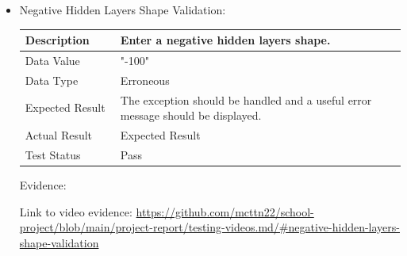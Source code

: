 \documentclass[./project-report/src/latex/project-report.tex]{subfiles}
\begin{document}
\begin{itemize}
	\item Negative Hidden Layers Shape Validation: \newline\newline
		\begin{tabular}{|p{0.25\linewidth}|p{0.75\linewidth}|}
			\hline
			Description & Enter a negative hidden layers shape. \\
			\hline
			Data Value & "-100" \\
			\hline
			Data Type & Erroneous \\
			\hline
			Expected Result & The exception should be handled and a useful error message should be displayed. \\
			\hline
			Actual Result & Expected Result \\
			\hline
			Test Status & Pass \\
			\hline
		\end{tabular}

		\vspace{5mm}

		Evidence:
		\begin{figure}[h!]
		\centering
		\end{figure}

		\begin{sloppypar}
		Link to video evidence: \url{https://github.com/mcttn22/school-project/blob/main/project-report/testing-videos.md/#negative-hidden-layers-shape-validation}
		\end{sloppypar}

	\pagebreak


\end{itemize}
\end{document}
